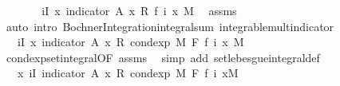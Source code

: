 \begin{isabellebody}
\ \ \isamarkupfalse%
\ \isamarkupfalse%
\ {\isachardoublequoteopen}{\isachardot}{\kern0pt}{\isachardot}{\kern0pt}{\isachardot}{\kern0pt}\ {\isacharequal}{\kern0pt}\ {\isacharparenleft}{\kern0pt}{\isasymSum}i{\isasymin}I{\isachardot}{\kern0pt}\ {\isacharparenleft}{\kern0pt}{\isasymintegral}x{\isachardot}{\kern0pt}\ indicator\ A\ x\ {\isacharasterisk}{\kern0pt}\isactrlsub R\ f\ i\ x\ {\isasympartial}M{\isacharparenright}{\kern0pt}{\isacharparenright}{\kern0pt}{\isachardoublequoteclose}\ \isamarkupfalse%
\ assms\ \isamarkupfalse%
\ {\isacharparenleft}{\kern0pt}auto\ intro{\isacharbang}{\kern0pt}{\isacharcolon}{\kern0pt}\ Bochner{\isacharunderscore}{\kern0pt}Integration{\isachardot}{\kern0pt}integral{\isacharunderscore}{\kern0pt}sum\ integrable{\isacharunderscore}{\kern0pt}mult{\isacharunderscore}{\kern0pt}indicator{\isacharparenright}{\kern0pt}\isanewline
\ \ \isamarkupfalse%
\ \isamarkupfalse%
\ {\isachardoublequoteopen}{\isachardot}{\kern0pt}{\isachardot}{\kern0pt}{\isachardot}{\kern0pt}\ {\isacharequal}{\kern0pt}\ {\isacharparenleft}{\kern0pt}{\isasymSum}i{\isasymin}I{\isachardot}{\kern0pt}\ {\isacharparenleft}{\kern0pt}{\isasymintegral}x{\isachardot}{\kern0pt}\ indicator\ A\ x\ {\isacharasterisk}{\kern0pt}\isactrlsub R\ cond{\isacharunderscore}{\kern0pt}exp\ M\ F\ {\isacharparenleft}{\kern0pt}f\ i{\isacharparenright}{\kern0pt}\ x\ {\isasympartial}M{\isacharparenright}{\kern0pt}{\isacharparenright}{\kern0pt}{\isachardoublequoteclose}\ \isamarkupfalse%
\ cond{\isacharunderscore}{\kern0pt}exp{\isacharunderscore}{\kern0pt}set{\isacharunderscore}{\kern0pt}integral{\isacharbrackleft}{\kern0pt}OF\ assms{\isacharbrackright}{\kern0pt}\ \isamarkupfalse%
\ {\isacharparenleft}{\kern0pt}simp\ add{\isacharcolon}{\kern0pt}\ set{\isacharunderscore}{\kern0pt}lebesgue{\isacharunderscore}{\kern0pt}integral{\isacharunderscore}{\kern0pt}def{\isacharparenright}{\kern0pt}\isanewline
\ \ \isamarkupfalse%
\ \isamarkupfalse%
\ {\isachardoublequoteopen}{\isachardot}{\kern0pt}{\isachardot}{\kern0pt}{\isachardot}{\kern0pt}\ {\isacharequal}{\kern0pt}\ {\isacharparenleft}{\kern0pt}{\isasymintegral}x{\isachardot}{\kern0pt}\ {\isacharparenleft}{\kern0pt}{\isasymSum}i{\isasymin}I{\isachardot}{\kern0pt}\ indicator\ A\ x\ {\isacharasterisk}{\kern0pt}\isactrlsub R\ cond{\isacharunderscore}{\kern0pt}exp\ M\ F\ {\isacharparenleft}{\kern0pt}f\ i{\isacharparenright}{\kern0pt}\ x{\isacharparenright}{\kern0pt}{\isasympartial}M{\isacharparenright}{\kern0pt}{\isachardoublequoteclose}\ \isamarkupfalse%

\end{isabellebody}
